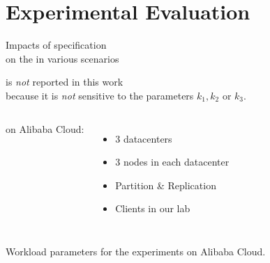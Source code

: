 \section{Experimental Evaluation}

\begin{frame}{}
  \begin{center}
    Impacts of \rvsi{} specification \\[5pt]
    on the \emph{} in various scenarios
  \end{center}

  \pause
  \vspace{0.50cm}
  \begin{center}
     is \emph{not} reported in this work \\[5pt]
    because it is \emph{not} sensitive to the parameters $k_1, k_2$ or $k_3$.
  \end{center}
\end{frame}

\begin{frame}{}
  \begin{columns}
      \chameleon{} on Alibaba Cloud:
      \begin{itemize}
	\item 3 datacenters~\footnotemark[1]
	\item 3 nodes in each datacenter
	\item Partition \& Replication
	\item Clients in our lab~\footnotemark[2]
      \end{itemize}
  \end{columns}

\end{frame}

\begin{frame}{}
  \centerline{Workload parameters for the experiments on Alibaba Cloud.}
  
\end{frame}

